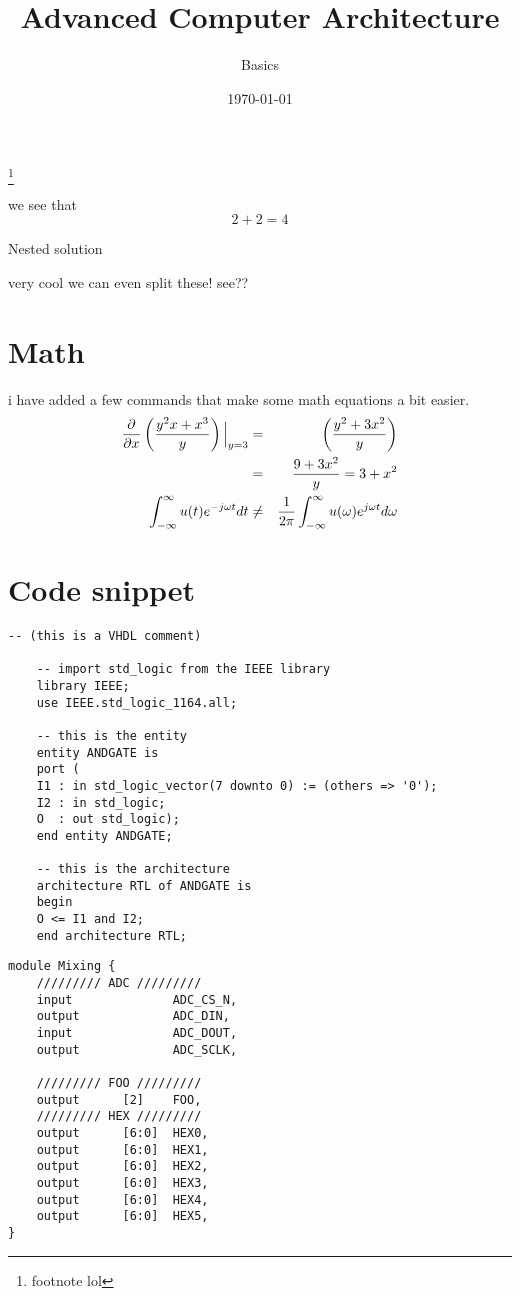 \documentclass[12pt]{article}
\title{Advanced Computer Architecture}
\subtitle{Basics}
\date{\today}
\begin{document}
\maketitlepage
\maketitlestart
\blindtext[1]
\footnote{footnote lol}
\begin{qsolve}[My conclusion]
	we see that $$2+2=4$$
	\begin{qsolve}[]
		Nested solution
	\end{qsolve}
    very cool we can even split these!
    \splitqsolve
    see??
\end{qsolve}
\vfil
\begin{conclusion}
	\blindtext
\end{conclusion}
\clearpage
\section{Math}
i have added a few commands that make some math equations
a bit easier.
\begin{eqnarray*}
	\pderivv{\frac{y^2x+x^3}{y}}{x}\Big|_{y=3} &=& \left(\frac{y^2+3x^2}{y}\right)\\
	&=& \frac{9+3x^2}{y} = 3 + x^2\\
	\fourier{u(t)} &\neq& \ifourier{u(\omega)}
\end{eqnarray*}
\section{Code snippet}
\begin{lstlisting}[label=case_sens, caption=An example of VHDL]
	-- (this is a VHDL comment)
	
	-- import std_logic from the IEEE library
	library IEEE;
	use IEEE.std_logic_1164.all;
	
	-- this is the entity
	entity ANDGATE is
	port ( 
	I1 : in std_logic_vector(7 downto 0) := (others => '0');
	I2 : in std_logic;
	O  : out std_logic);
	end entity ANDGATE;
	
	-- this is the architecture
	architecture RTL of ANDGATE is
	begin
	O <= I1 and I2;
	end architecture RTL;
\end{lstlisting}


\begin{lstlisting}[style={verilog-style},caption={verilog code snippet}]
module Mixing {
    ///////// ADC /////////
    input              ADC_CS_N,
    output             ADC_DIN,
    input              ADC_DOUT,
    output             ADC_SCLK,

    ///////// FOO /////////
    output      [2]    FOO,
    ///////// HEX /////////
    output      [6:0]  HEX0,
    output      [6:0]  HEX1,
    output      [6:0]  HEX2,
    output      [6:0]  HEX3,
    output      [6:0]  HEX4,
    output      [6:0]  HEX5,
}
\end{lstlisting}
\end{document}
